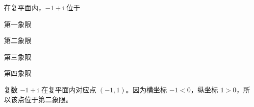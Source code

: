 \begin{question}
在复平面内，$-1+\mathrm{i}$ 位于 \paren[B]
\begin{choices}
  \item 第一象限
  \item 第二象限
  \item 第三象限
  \item 第四象限
\end{choices}
\begin{solution}
复数 $-1+\mathrm{i}$ 在复平面内对应点 $(-1,1)$。因为横坐标 $-1<0$，纵坐标 $1>0$，所以该点位于第二象限。
\end{solution}
\end{question}

